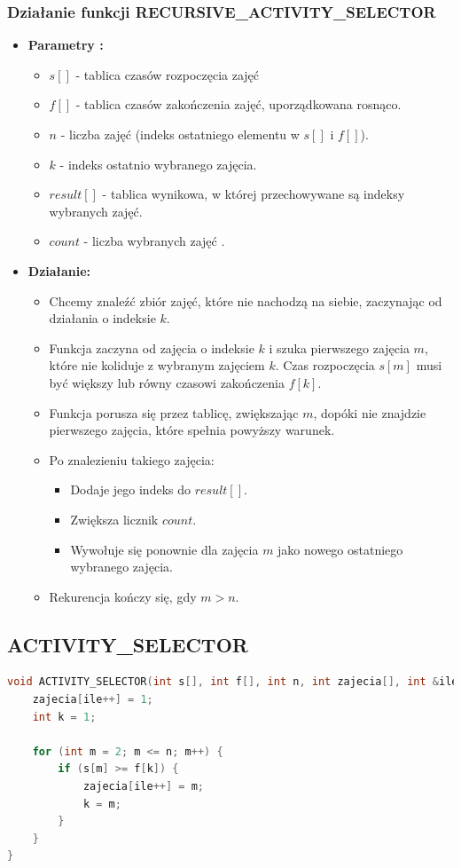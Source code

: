 \documentclass{article}
\begin{document}
		\subsubsection*{Działanie funkcji RECURSIVE\_ACTIVITY\_SELECTOR}
		\begin{itemize}
			\item \textbf{Parametry :}
			\begin{itemize}
				\item $s[]$ - tablica czasów rozpoczęcia zajęć
				\item $f[]$ - tablica czasów zakończenia zajęć, uporządkowana rosnąco.
				\item $n$ - liczba zajęć (indeks ostatniego elementu w $s[]$ i $f[]$).
				\item $k$ - indeks ostatnio wybranego zajęcia.
				\item $result[]$ - tablica wynikowa, w której przechowywane są indeksy wybranych zajęć.
				\item $count$ - liczba wybranych zajęć .
			\end{itemize}
			\item \textbf{Działanie:}
			\begin{itemize}
				\item Chcemy znaleźć zbiór zajęć, które nie nachodzą na siebie, zaczynając od działania o indeksie $k$.
				\item  Funkcja zaczyna od zajęcia o indeksie $k$ i szuka pierwszego zajęcia $m$, które nie koliduje z wybranym zajęciem $k$. Czas rozpoczęcia $s[m]$ musi być większy lub równy czasowi zakończenia $f[k]$.
				\item  Funkcja porusza się przez tablicę, zwiększając $m$, dopóki nie znajdzie pierwszego zajęcia, które spełnia powyższy warunek.
				\item Po znalezieniu takiego zajęcia:
				\begin{itemize}
					\item Dodaje jego indeks do $result[]$.
					\item Zwiększa licznik $count$.
					\item Wywołuje się ponownie dla zajęcia $m$ jako nowego ostatniego wybranego zajęcia.
				\end{itemize}
				\item Rekurencja kończy się, gdy $m > n$. 
			\end{itemize}
		
		\end{itemize}
		
	\subsection*{ACTIVITY\_SELECTOR} 
	\begin{lstlisting}[language=C++, tabsize=3, basicstyle=\footnotesize]
void ACTIVITY_SELECTOR(int s[], int f[], int n, int zajecia[], int &ile){
	zajecia[ile++] = 1; 
	int k = 1;
	
	for (int m = 2; m <= n; m++) {
		if (s[m] >= f[k]) {
			zajecia[ile++] = m; 
			k = m;
		}
	}
}
	\end{lstlisting}
\end{document}
